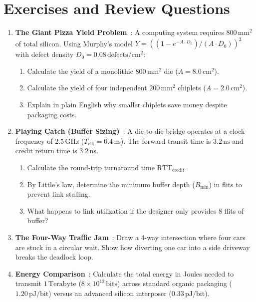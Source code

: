 \section{Exercises and Review Questions}
\label{sec:ch9_exercises}

\begin{enumerate}
    \item \textbf{The Giant Pizza Yield Problem}~\cite{Mack2007,Murphy1964}: A computing system requires $800\,\mathrm{mm^2}$ of total silicon. Using Murphy's model $Y = ((1 - e^{-A \cdot D_0})/(A \cdot D_0))^2$ with defect density $D_0 = 0.08\,\mathrm{defects/cm^2}$:
    \begin{enumerate}
        \item Calculate the yield of a monolithic $800\,\mathrm{mm^2}$ die ($A = 8.0\,\mathrm{cm^2}$).
        \item Calculate the yield of four independent $200\,\mathrm{mm^2}$ chiplets ($A = 2.0\,\mathrm{cm^2}$).
        \item Explain in plain English why smaller chiplets save money despite packaging costs.
    \end{enumerate}

    \item \textbf{Playing Catch (Buffer Sizing)}~\cite{Little1961,DallyPrinciples}: A die-to-die bridge operates at a clock frequency of $2.5\,\mathrm{GHz}$ ($T_{\mathrm{clk}} = 0.4\,\mathrm{ns}$). The forward transit time is $3.2\,\mathrm{ns}$ and credit return time is $3.2\,\mathrm{ns}$.
    \begin{enumerate}
        \item Calculate the round-trip turnaround time $\mathrm{RTT}_{\mathrm{credit}}$.
        \item By Little's law, determine the minimum buffer depth ($B_{\mathrm{min}}$) in flits to prevent link stalling.
        \item What happens to link utilization if the designer only provides 8 flits of buffer?
    \end{enumerate}

    \item \textbf{The Four-Way Traffic Jam}~\cite{Wang2026Swap,Zhu2026ScaDA}: Draw a 4-way intersection where four cars are stuck in a circular wait. Show how diverting one car into a side driveway breaks the deadlock loop.

    \item \textbf{Energy Comparison}~\cite{UCIe2023,DasSharma2022}: Calculate the total energy in Joules needed to transmit $1\,\mathrm{Terabyte}$ ($8 \times 10^{12}\,\mathrm{bits}$) across standard organic packaging ($1.20\,\mathrm{pJ/bit}$) versus an advanced silicon interposer ($0.33\,\mathrm{pJ/bit}$).
\end{enumerate}

